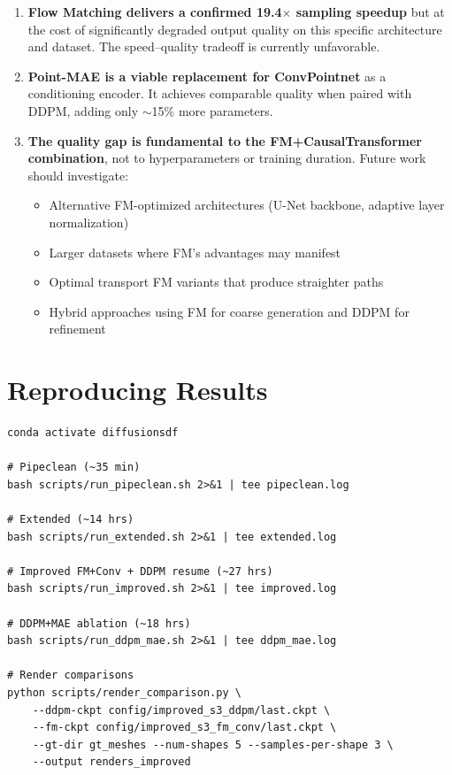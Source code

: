 \documentclass[11pt,letterpaper]{article}
\begin{document}
\begin{enumerate}
    \item \textbf{Flow Matching delivers a confirmed 19.4$\times$ sampling speedup} but at the cost of significantly degraded output quality on this specific architecture and dataset. The speed--quality tradeoff is currently unfavorable.

    \item \textbf{Point-MAE is a viable replacement for ConvPointnet} as a conditioning encoder. It achieves comparable quality when paired with DDPM, adding only ${\sim}$15\% more parameters.

    \item \textbf{The quality gap is fundamental to the FM+CausalTransformer combination}, not to hyperparameters or training duration. Future work should investigate:
    \begin{itemize}
        \item Alternative FM-optimized architectures (U-Net backbone, adaptive layer normalization)
        \item Larger datasets where FM's advantages may manifest
        \item Optimal transport FM variants that produce straighter paths
        \item Hybrid approaches using FM for coarse generation and DDPM for refinement
    \end{itemize}
\end{enumerate}

\section{Reproducing Results}

\begin{verbatim}
conda activate diffusionsdf

# Pipeclean (~35 min)
bash scripts/run_pipeclean.sh 2>&1 | tee pipeclean.log

# Extended (~14 hrs)
bash scripts/run_extended.sh 2>&1 | tee extended.log

# Improved FM+Conv + DDPM resume (~27 hrs)
bash scripts/run_improved.sh 2>&1 | tee improved.log

# DDPM+MAE ablation (~18 hrs)
bash scripts/run_ddpm_mae.sh 2>&1 | tee ddpm_mae.log

# Render comparisons
python scripts/render_comparison.py \
    --ddpm-ckpt config/improved_s3_ddpm/last.ckpt \
    --fm-ckpt config/improved_s3_fm_conv/last.ckpt \
    --gt-dir gt_meshes --num-shapes 5 --samples-per-shape 3 \
    --output renders_improved
\end{verbatim}
\end{document}
